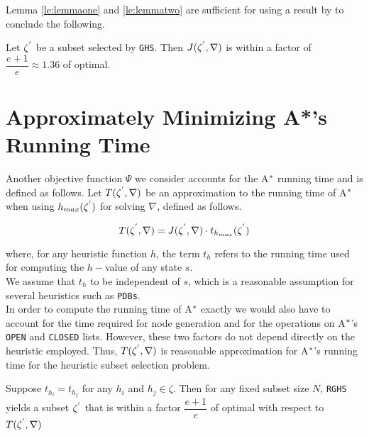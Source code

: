 Lemma \ref{le:lemmaone} and \ref{le:lemmatwo} are sufficient for using a result by \cite{buchbinder2014submodular} to conclude the following.

\begin{theorem}
Let $\zeta\sp{'}$ be a subset selected by \texttt{GHS}. Then $J(\zeta\sp{'}, \nabla)$ is within a factor of $\dfrac{e+1}{e} \approx 1.36$ of optimal.
\label{th:theorem_one}
\end{theorem}

\section{Approximately Minimizing A*'s Running Time}
\noindent
Another objective function $\Psi$ we consider accounts for the A$\sp{*}$ running time and is defined as follows. Let $T(\zeta\sp{'},\nabla)$ be an approximation to the running time of A$\sp{*}$ when using $h_{max}(\zeta\sp{'})$ for solving $\nabla$, defined as follows.

\begin{equation}
T(\zeta\sp{'}, \nabla) = J(\zeta\sp{'},\nabla) \cdot t_{h_{max}}(\zeta\sp{'})
\label{eq:eq_time_solving}
\end{equation}

where, for any heuristic function $h$, the term $t_{h}$ refers to the running time used for computing the $h-$value of any state $s$. \\

We assume that $t_{h}$ to be independent of $s$, which is a reasonable assumption for several heuristics such as \texttt{PDBs}.\\

In order to compute the running time of A$\sp{*}$ exactly we would also have to account for the time required for node generation and for the operations on A$\sp{*}$'s \texttt{OPEN} and \texttt{CLOSED} lists. However, these two factors do not depend directly on the heuristic employed. Thus, $T(\zeta\sp{'},\nabla)$ is reasonable approximation for A$\sp{*}$'s running time for the heuristic subset selection problem.

\begin{theorem}
Suppose $t_{h_{i}} = t_{h_{j}}$ for any $h_{i}$ and $h_{j} \in \zeta$. Then for any fixed subset size $N$, \texttt{RGHS} yields a subset $\zeta\sp{'}$ that is within a factor $\dfrac{e+1}{e}$ of optimal with respect to $T(\zeta\sp{'},\nabla)$
\label{th:theorem_two}
\end{theorem}

